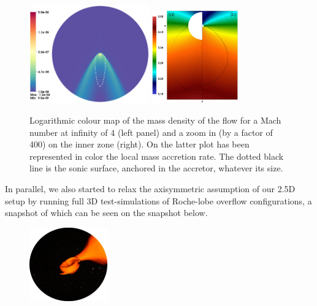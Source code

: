 \documentclass[
    a4paper, 12pt, onecolumn,
]{article}
\begin{document}
\begin{figure}[ht!]
 \centering
 \includegraphics[width=0.46\textwidth,clip]{M040.png}%
 \hspace*{2cm} 
 \includegraphics[width=0.33\textwidth,clip]{sonic_surface_different_inner_boundary_size.png}  
  \caption{Logarithmic colour map of the mass density of the flow for a Mach number at infinity of 4 (left panel) and a zoom in (by a factor of 400) on the inner zone (right). On the latter plot has been represented in color the local mass accretion rate. The dotted black line is the sonic surface, anchored in the accretor, whatever its size.}
  \label{fig:zoom}
\end{figure}

In parallel, we also started to relax the axisymmetric assumption of our 2.5D setup by running full 3D test-simulations of Roche-lobe overflow configurations, a snapshot of which can be seen on the snapshot below. 

\begin{figure}
\begin{center}
\includegraphics[width=0.3\textwidth]{RLOF_2.png}
\label{fig:RLOF}
\end{center}
\end{figure}
\end{document}
